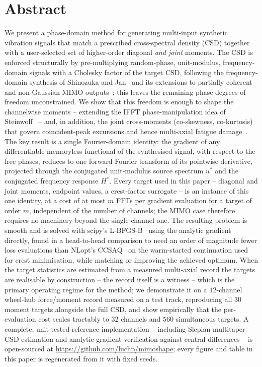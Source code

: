 \documentclass[10pt,a4paper]{article}
\numberwithin{equation}{section}
\begin{document}
\section*{Abstract}
We present a phase-domain method for generating multi-input synthetic vibration signals that match a prescribed cross-spectral density (CSD) together with a user-selected set of higher-order diagonal \emph{and joint} moments. The CSD is enforced structurally by pre-multiplying random-phase, unit-modulus, frequency-domain signals with a Cholesky factor of the target CSD, following the frequency-domain synthesis of Shinozuka and Jan~\cite{shinozuka1972digital} and its extensions to partially coherent and non-Gaussian MIMO outputs~\cite{smallwood1993coherent,smallwood_nongaussian,cui2011matrix}; this leaves the remaining phase degrees of freedom unconstrained. We show that this freedom is enough to shape the channelwise moments -- extending the IFFT phase-manipulation idea of Steinwolf~\cite{steinwolf2011ifft,steinwolf2011twr,steinwolf_book_ngaussian} -- and, in addition, the joint cross-moments (co-skewness, co-kurtosis) that govern coincident-peak excursions and hence multi-axial fatigue damage~\cite{saathoff2006synthetic}. The key result is a single Fourier-domain identity: the gradient of any differentiable memoryless functional of the synthesised signal, with respect to the free phases, reduces to one forward Fourier transform of its pointwise derivative, projected through the conjugated unit-modulus source spectrum $u^*$ and the conjugated frequency response $H^*$. Every target used in this paper -- diagonal and joint moments, endpoint values, a crest-factor surrogate -- is an instance of this one identity, at a cost of at most $m$ FFTs per gradient evaluation for a target of order $m$, independent of the number of channels; the MIMO case therefore requires no machinery beyond the single-channel one. The resulting problem is smooth and is solved with scipy's L-BFGS-B~\cite{byrd1995lbfgsb,virtanen2020scipy} using the analytic gradient directly, found in a head-to-head comparison to need an order of magnitude fewer loss evaluations than NLopt's CCSAQ~\cite{svanberg2002ccsaq,johnson_nlopt} on the warm-started continuation used for crest minimisation, while matching or improving the achieved optimum. When the target statistics are estimated from a measured multi-axial record the targets are realisable by construction -- the record itself is a witness -- which is the primary operating regime for the method; we demonstrate it on a $12$-channel wheel-hub force/moment record measured on a test track, reproducing all $30$ moment targets alongside the full CSD, and show empirically that the per-evaluation cost scales tractably to $32$ channels and $560$ simultaneous targets. A complete, unit-tested reference implementation -- including Slepian multitaper CSD estimation and analytic-gradient verification against central differences -- is open-sourced at \url{https://github.com/luchp/mimoshape}; every figure and table in this paper is regenerated from it with fixed seeds.
\end{document}
